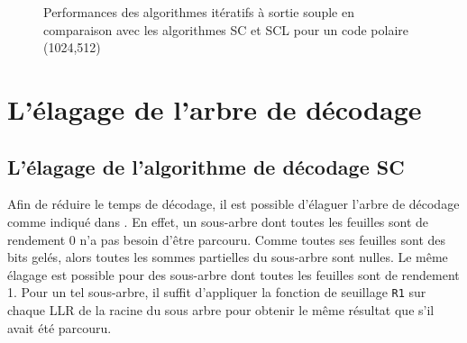 \begin{figure}[h]
  \centering
  
  \caption{Performances des algorithmes itératifs à sortie souple en comparaison avec les algorithmes SC et SCL pour un code polaire (1024,512)}
  \label{fig:bp_scan}
\end{figure}

\clearpage


\section{L'élagage de l'arbre de décodage}


\subsection{L'élagage de l'algorithme de décodage SC}
Afin de réduire le temps de décodage, il est possible d'élaguer l'arbre de décodage comme indiqué dans \cite{alamdar-yazdi_simplified_2011}. En effet, un sous-arbre dont toutes les feuilles sont de rendement 0 n'a pas besoin d'être parcouru. Comme toutes ses feuilles sont des bits gelés, alors toutes les sommes partielles du sous-arbre sont nulles. Le même élagage est possible pour des sous-arbre dont toutes les feuilles sont de rendement 1. Pour un tel sous-arbre, il suffit d'appliquer la fonction de seuillage \texttt{R1} sur chaque LLR de la racine du sous arbre pour obtenir le même résultat que s'il avait été parcouru.

